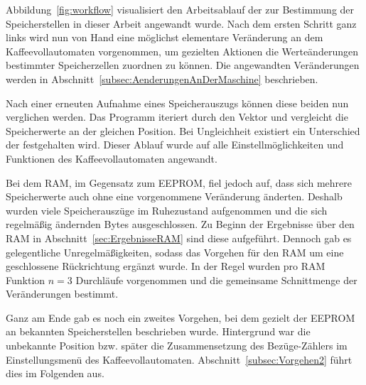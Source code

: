 Abbildung~\ref{fig:workflow} visualisiert den Arbeitsablauf der zur Bestimmung der Speicherstellen in dieser Arbeit angewandt wurde.
Nach dem ersten Schritt ganz links wird nun von Hand eine möglichst elementare Veränderung an dem Kaffeevollautomaten vorgenommen, um gezielten Aktionen die Werteänderungen bestimmter Speicherzellen zuordnen zu können.
Die angewandten Veränderungen werden in Abschnitt~\ref{subsec:AenderungenAnDerMaschine} beschrieben.

Nach einer erneuten Aufnahme eines Speicherauszugs können diese beiden nun verglichen werden.
Das Programm iteriert durch den Vektor und vergleicht die Speicherwerte an der gleichen Position.
Bei Ungleichheit existiert ein Unterschied der festgehalten wird.
Dieser Ablauf wurde auf alle Einstellmöglichkeiten und Funktionen des Kaffeevollautomaten angewandt.

Bei dem \ac{RAM}, im Gegensatz zum \ac{EEPROM}, fiel jedoch auf, dass sich mehrere Speicherwerte auch ohne eine vorgenommene Veränderung änderten.
Deshalb wurden viele Speicherauszüge im Ruhezustand aufgenommen und die sich regelmäßig ändernden Bytes ausgeschlossen.
Zu Beginn der Ergebnisse über den \ac{RAM} in Abschnitt~\ref{sec:ErgebnisseRAM} sind diese aufgeführt.
Dennoch gab es gelegentliche Unregelmäßigkeiten, sodass das Vorgehen für den \ac{RAM} um eine geschlossene Rückrichtung ergänzt wurde.
In der Regel wurden pro \ac{RAM} Funktion $n=3$ Durchläufe vorgenommen und die gemeinsame Schnittmenge der Veränderungen bestimmt.

Ganz am Ende gab es noch ein zweites Vorgehen, bei dem gezielt der \ac{EEPROM} an bekannten Speicherstellen beschrieben wurde.
Hintergrund war die unbekannte Position bzw. später die Zusammensetzung des Bezüge-Zählers im Einstellungsmenü des Kaffeevollautomaten.
Abschnitt~\ref{subsec:Vorgehen2} führt dies im Folgenden aus.

